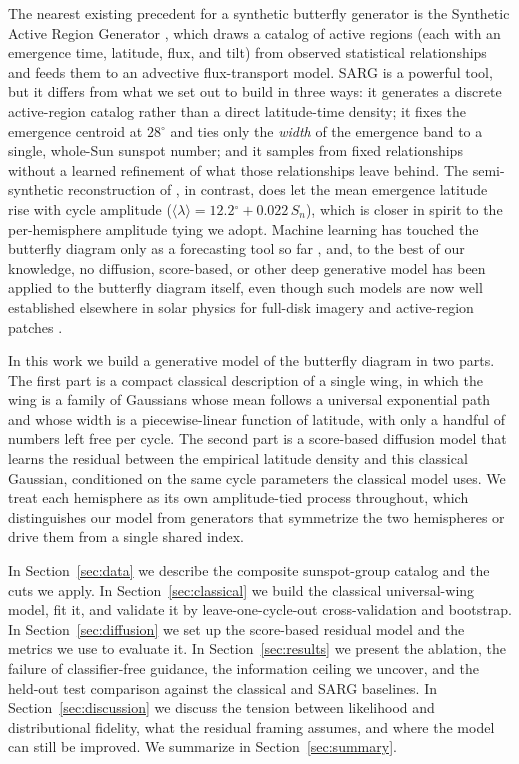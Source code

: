\documentclass[twocolumn]{aastex631}
\newcommand{\degr}{\ensuremath{^{\circ}}}
\begin{document}
The nearest existing precedent for a synthetic butterfly generator is the
Synthetic Active Region Generator \citep[SARG;][CIT]{JhaUpton2024, Jha2025},
which draws a catalog of active regions (each with an emergence time, latitude,
flux, and tilt) from observed statistical relationships and feeds them to an
advective flux-transport model. SARG is a powerful tool, but it differs from
what we set out to build in three ways: it generates a discrete active-region
catalog rather than a direct latitude-time density; it fixes the emergence
centroid at $28\degr$ and ties only the \emph{width} of the emergence band to a
single, whole-Sun sunspot number; and it samples from fixed relationships
without a learned refinement of what those relationships leave behind. The
semi-synthetic reconstruction of \citet[CIT]{Jiang2011}, in contrast, does let
the mean emergence latitude rise with cycle amplitude ($\langle\lambda\rangle =
12.2\degr + 0.022\,S_n$), which is closer in spirit to the per-hemisphere
amplitude tying we adopt. Machine learning has touched the butterfly diagram
only as a forecasting tool so far \citep[CIT]{Covas2017, Covas2019}, and, to the
best of our knowledge, no diffusion, score-based, or other deep generative model
has been applied to the butterfly diagram itself, even though such models are
now well established elsewhere in solar physics for full-disk imagery and
active-region patches \citep[CIT]{Ramunno2024}.

In this work we build a generative model of the butterfly diagram in two parts.
The first part is a compact classical description of a single wing, in which the
wing is a family of Gaussians whose mean follows a universal exponential path
and whose width is a piecewise-linear function of latitude, with only a handful
of numbers left free per cycle. The second part is a score-based diffusion model
that learns the residual between the empirical latitude density and this
classical Gaussian, conditioned on the same cycle parameters the classical model
uses. We treat each hemisphere as its own amplitude-tied process throughout,
which distinguishes our model from generators that symmetrize the two
hemispheres or drive them from a single shared index.

In Section~\ref{sec:data} we describe the composite sunspot-group catalog and
the cuts we apply. In Section~\ref{sec:classical} we build the classical
universal-wing model, fit it, and validate it by leave-one-cycle-out
cross-validation and bootstrap. In Section~\ref{sec:diffusion} we set up the
score-based residual model and the metrics we use to evaluate it. In
Section~\ref{sec:results} we present the ablation, the failure of classifier-free
guidance, the information ceiling we uncover, and the held-out test comparison
against the classical and SARG baselines. In Section~\ref{sec:discussion} we
discuss the tension between likelihood and distributional fidelity, what the
residual framing assumes, and where the model can still be improved. We
summarize in Section~\ref{sec:summary}.
\end{document}
